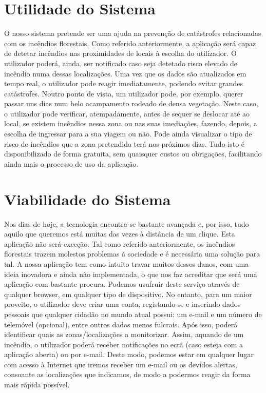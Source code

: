 \documentclass[a4paper,12pt]{scrreprt}
\newcommand{\tab}{
    \hspace{1cm}}
\begin{document}
    \section{Utilidade do Sistema}
        \tab O nosso sistema pretende ser uma ajuda na prevenção de catástrofes relacionadas com os incêndios florestais. Como referido anteriormente, a aplicação será capaz de detetar incêndios nas proximidades de locais à escolha do utilizador. O utilizador poderá, ainda, ser notificado caso seja detetado risco elevado de incêndio numa dessas localizações. Uma vez que os dados são atualizados em tempo real, o utilizador pode reagir imediatamente, podendo evitar grandes catástrofes. Noutro ponto de vista, um utilizador pode, por exemplo, querer passar uns dias num belo acampamento rodeado de densa vegetação. Neste caso, o utilizador pode verificar, atempadamente, antes de sequer se deslocar até ao local, se existem incêndios nessa zona ou nas suas imediações, fazendo, depois,  a escolha de ingressar para a sua viagem ou não. Pode ainda visualizar o tipo de risco de incêndios que a zona pretendida terá nos próximos dias. Tudo isto é disponibilizado de forma gratuita, sem quaisquer custos ou obrigações, facilitando ainda mais o processo de uso da aplicação.

    \section{Viabilidade do Sistema}
        \tab Nos dias de hoje, a tecnologia encontra-se bastante avançada e, por isso, tudo aquilo que queremos está muitas das vezes à distância de um clique. Esta aplicação não será exceção. Tal como referido anteriormente, os incêndios florestais trazem molestos problemas à sociedade e é necessária uma solução para tal. A nossa aplicação tem como intuito travar muitos desses danos, com uma ideia inovadora e ainda não implementada, o que nos faz acreditar que será uma aplicação com bastante procura. Podemos usufruir deste serviço através de qualquer browser, em qualquer tipo de dispositivo. No entanto, para um maior proveito, o utilizador deve criar uma conta, registando-se e inserindo dados pessoais que qualquer cidadão no mundo atual possui: um e-mail e um número de telemóvel (opcional), entre outros dados menos fulcrais. Após isso, poderá identificar quais as zonas/localizações a monitorizar. Assim, aquando de um incêndio, o utilizador poderá receber notificações no ecrã (caso esteja com a aplicação aberta) ou por e-mail. Deste modo, podemos estar em qualquer lugar com acesso à Internet que iremos receber um e-mail ou os devidos alertas, consoante as localizações que indicamos, de modo a podermos reagir da forma mais rápida possível. 
\end{document}
